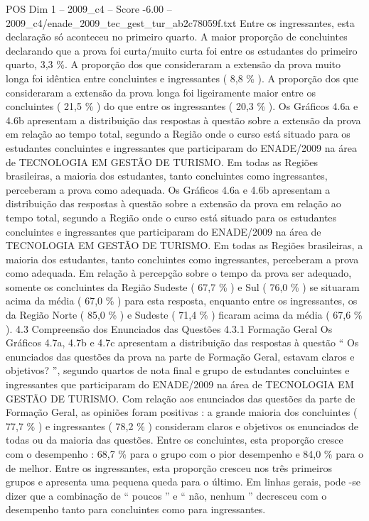 \begin{textsample}{POS Dim 1 – 2009\_c4 – Score -6.00 – 2009\_c4/enade\_2009\_tec\_gest\_tur\_ab2c78059f.txt}
Entre os ingressantes, esta declaração só aconteceu no primeiro quarto.
A maior proporção de concluintes declarando que a prova foi curta/muito curta foi entre os estudantes do primeiro quarto, 3,3 \%.
A proporção dos que consideraram a extensão da prova muito longa foi idêntica entre concluintes e ingressantes ( 8,8 \% ).
A proporção dos que consideraram a extensão da prova longa foi ligeiramente maior entre os concluintes ( 21,5 \% ) do que entre os ingressantes ( 20,3 \% ).
Os Gráficos 4.6a e 4.6b apresentam a distribuição das respostas à questão sobre a extensão da prova em relação ao tempo total, segundo a Região onde o curso está situado para os estudantes concluintes e ingressantes que participaram do ENADE/2009 na área de TECNOLOGIA EM GESTÃO DE TURISMO.
Em todas as Regiões brasileiras, a maioria dos estudantes, tanto concluintes como ingressantes, perceberam a prova como adequada.
Os Gráficos 4.6a e 4.6b apresentam a distribuição das respostas à questão sobre a extensão da prova em relação ao tempo total, segundo a Região onde o curso está situado para os estudantes concluintes e ingressantes que participaram do ENADE/2009 na área de TECNOLOGIA EM GESTÃO DE TURISMO.
Em todas as Regiões brasileiras, a maioria dos estudantes, tanto concluintes como ingressantes, perceberam a prova como adequada.
Em relação à percepção sobre o tempo da prova ser adequado, somente os concluintes da Região Sudeste ( 67,7 \% ) e Sul ( 76,0 \% ) se situaram acima da média ( 67,0 \% ) para esta resposta, enquanto entre os ingressantes, os da Região Norte ( 85,0 \% ) e Sudeste ( 71,4 \% ) ficaram acima da média ( 67,6 \% ). 4.3 Compreensão dos Enunciados das Questões 4.3.1 Formação Geral Os Gráficos 4.7a, 4.7b e 4.7c apresentam a distribuição das respostas à questão “ Os enunciados das questões da prova na parte de Formação Geral, estavam claros e objetivos? ”, segundo quartos de nota final e grupo de estudantes concluintes e ingressantes que participaram do ENADE/2009 na área de TECNOLOGIA EM GESTÃO DE TURISMO.
Com relação aos enunciados das questões da parte de Formação Geral, as opiniões foram positivas : a grande maioria dos concluintes ( 77,7 \% ) e ingressantes ( 78,2 \% ) consideram claros e objetivos os enunciados de todas ou da maioria das questões.
Entre os concluintes, esta proporção cresce com o desempenho : 68,7 \% para o grupo com o pior desempenho e 84,0 \% para o de melhor.
Entre os ingressantes, esta proporção cresceu nos três primeiros grupos e apresenta uma pequena queda para o último.
Em linhas gerais, pode -se dizer que a combinação de “ poucos ” e “ não, nenhum ” decresceu com o desempenho tanto para concluintes como para ingressantes.

\end{textsample}
